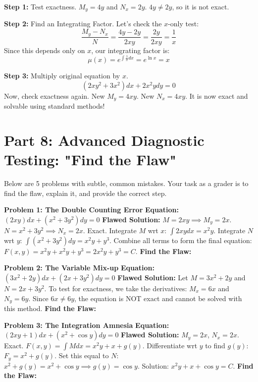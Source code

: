\documentclass[11pt]{article}
\begin{document}
\textbf{Step 1:} Test exactness. $M_y = 4y$ and $N_x = 2y$. $4y \neq 2y$, so it is not exact.

\textbf{Step 2:} Find an Integrating Factor.
Let's check the $x$-only test:
\[ \frac{M_y - N_x}{N} = \frac{4y - 2y}{2xy} = \frac{2y}{2xy} = \frac{1}{x} \]
Since this depends only on $x$, our integrating factor is:
\[ \mu(x) = e^{\int \frac{1}{x} dx} = e^{\ln x} = x \]

\textbf{Step 3:} Multiply original equation by $x$.
\[ \left(2xy^2 + 3x^2\right) dx + 2x^2 y dy = 0 \]
Now, check exactness again. New $M_y = 4xy$. New $N_x = 4xy$. It is now exact and solvable using standard methods!

\newpage
\section{Part 8: Advanced Diagnostic Testing: "Find the Flaw"}

Below are 5 problems with subtle, common mistakes. Your task as a grader is to find the flaw, explain it, and provide the correct step.

\vspace{0.5cm}
\noindent \textbf{Problem 1: The Double Counting Error}
\newline \textbf{Equation:} $(2xy) dx + (x^2 + 3y^2) dy = 0$
\newline \textbf{Flawed Solution:} 
$M = 2xy \implies M_y = 2x$. $N = x^2 + 3y^2 \implies N_x = 2x$. Exact.
Integrate $M$ wrt $x$: $\int 2xy dx = x^2 y$.
Integrate $N$ wrt $y$: $\int (x^2 + 3y^2) dy = x^2 y + y^3$.
Combine all terms to form the final equation:
$F(x,y) = x^2 y + x^2 y + y^3 = 2x^2 y + y^3 = C$.
\newline \textbf{Find the Flaw:}
\vspace{1cm} %

\noindent \textbf{Problem 2: The Variable Mix-up}
\newline \textbf{Equation:} $(3x^2 + 2y) dx + (2x + 3y^2) dy = 0$
\newline \textbf{Flawed Solution:} 
Let $M = 3x^2 + 2y$ and $N = 2x + 3y^2$. 
To test for exactness, we take the derivatives:
$M_x = 6x$ and $N_y = 6y$.
Since $6x \neq 6y$, the equation is NOT exact and cannot be solved with this method.
\newline \textbf{Find the Flaw:}
\vspace{1cm}

\noindent \textbf{Problem 3: The Integration Amnesia}
\newline \textbf{Equation:} $(2xy + 1) dx + (x^2 + \cos y) dy = 0$
\newline \textbf{Flawed Solution:} 
$M_y = 2x$, $N_x = 2x$. Exact.
$F(x,y) = \int M dx = x^2 y + x + g(y)$.
Differentiate wrt $y$ to find $g(y)$:
$F_y = x^2 + g(y)$. Set this equal to $N$:
$x^2 + g(y) = x^2 + \cos y \implies g(y) = \cos y$.
Solution: $x^2 y + x + \cos y = C$.
\newline \textbf{Find the Flaw:}
\vspace{1cm}
\end{document}
